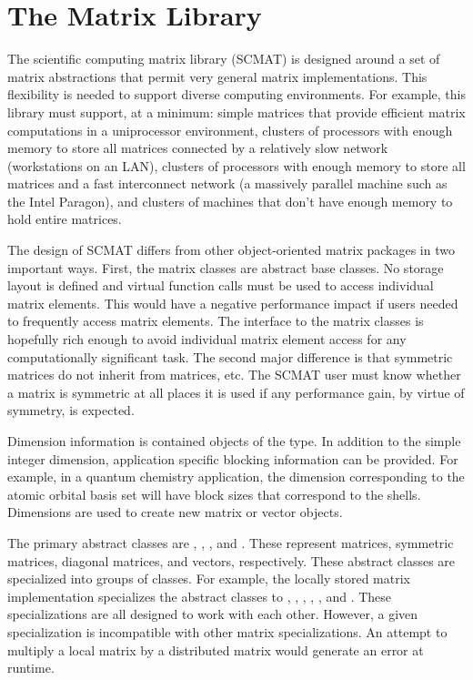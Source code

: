 
\addtocounter{clsheadingnum}{1}
\addtocounter{clssubheadingnum}{1}

\chapter{The Matrix Library}

The scientific computing matrix library (SCMAT) is designed around a set
of matrix abstractions that permit very general matrix implementations.
This flexibility is needed to support diverse computing environments.
For example, this library must support, at a minimum: simple matrices
that provide efficient matrix computations in a uniprocessor
environment, clusters of processors with enough memory to store all
matrices connected by a relatively slow network (workstations on an
LAN), clusters of processors with enough memory to store all matrices
and a fast interconnect network (a massively parallel machine such as
the Intel Paragon), and clusters of machines that don't have enough
memory to hold entire matrices.

The design of SCMAT differs from other object-oriented matrix packages
in two important ways.  First, the matrix classes are abstract base
classes.  No storage layout is defined and virtual function calls must
be used to access individual matrix elements.  This would have a
negative performance impact if users needed to frequently access matrix
elements.  The interface to the matrix classes is hopefully rich enough
to avoid individual matrix element access for any computationally
significant task.  The second major difference is that symmetric
matrices do not inherit from matrices, etc.  The SCMAT user must know
whether a matrix is symmetric at all places it is used if any
performance gain, by virtue of symmetry, is expected.

Dimension information is contained objects of the 
type.  In addition to the simple integer dimension, application specific
blocking information can be provided.  For example, in a quantum chemistry
application, the dimension corresponding to the atomic orbital basis set
will have block sizes that correspond to the shells.  Dimensions are used
to create new matrix or vector objects.

The primary abstract classes are ,
, , and .
These represent matrices, symmetric matrices, diagonal matrices, and
vectors, respectively.  These abstract classes are specialized into groups
of classes.  For example, the locally stored matrix implementation
specializes the abstract classes to ,
, ,
, , and
.  These specializations are all designed to
work with each other.  However, a given specialization is incompatible with
other matrix specializations.  An attempt to multiply a local matrix by a
distributed matrix would generate an error at runtime.


